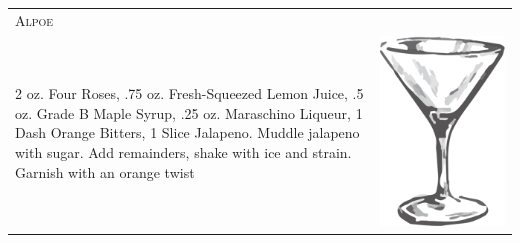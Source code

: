 \documentclass{article}
\begin{document}
\begin{tabular}{p{2in} p{0.5in}}
 \multicolumn{2}{p{3in}}{\centering\Huge\textsc{Alpoe}} \\ 
    \vspace{-0.1in}2 oz. Four Roses, .75 oz. Fresh-Squeezed Lemon Juice, .5 oz. Grade B Maple Syrup, .25 oz.  Maraschino Liqueur, 1 Dash Orange Bitters, 1 Slice Jalapeno. Muddle jalapeno with sugar. Add remainders, shake with ice and strain. Garnish with an orange twist &
   \vspace{-0.1in} \includegraphics{goblet.png}
\end{tabular}
\end{document}
